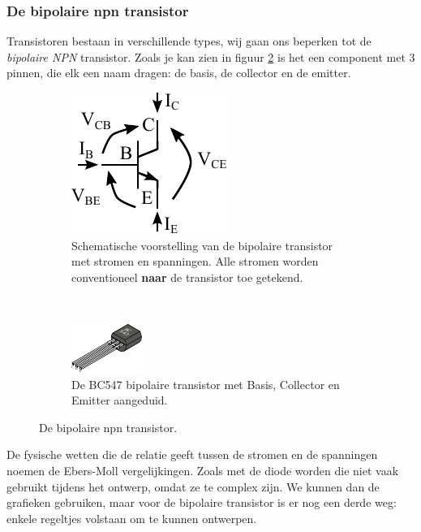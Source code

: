 \documentclass{article}
\begin{document}
			\subsubsection{De bipolaire npn transistor}
				 Transistoren bestaan in verschillende types, wij gaan ons beperken tot de \emph{bipolaire NPN} transistor. Zoals je kan zien in figuur \ref{subfig:transistor_bce} is het een component met 3 pinnen, die elk een naam dragen: de basis, de collector en de emitter.
				\begin{figure}[htbp]
				\centering
					\begin{subfigure}[b]{0.45\linewidth}
						\centering
					\includegraphics{transistor_VI}
					\caption{Schematische voorstelling van de bipolaire transistor met stromen en spanningen. Alle stromen worden conventioneel \textbf{naar} de transistor toe getekend.}
					\label{subfig:transistor_vi}
					\end{subfigure}
					~
					\begin{subfigure}[b]{0.45\linewidth}
						\centering
						\includegraphics[scale=2]{transistor}
						\caption{De BC547 bipolaire transistor met Basis, Collector en Emitter aangeduid.}
						\label{subfig:transistor_bce}
					\end{subfigure}
					
					\caption{De bipolaire npn transistor.}
					\label{fig:transistor}
				\end{figure}

				De fysische wetten die de relatie geeft tussen de stromen en de spanningen noemen de Ebers-Moll vergelijkingen. Zoals met de diode worden die niet vaak gebruikt tijdens het ontwerp, omdat ze te complex zijn. We kunnen dan  de grafieken gebruiken, maar voor de bipolaire transistor is er nog een derde weg: enkele regeltjes volstaan om te kunnen ontwerpen. 
\end{document}
